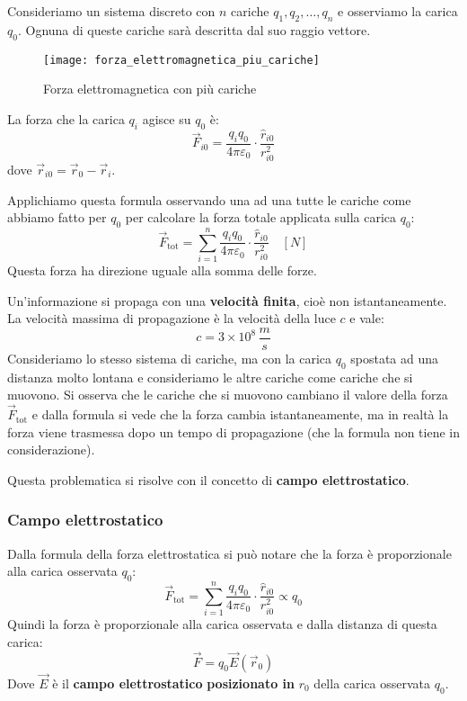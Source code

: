 \documentclass[a4paper]{article}
\begin{document}
Consideriamo un sistema discreto con \( n \) cariche \( q_1, q_2, \ldots, q_n \) e osserviamo
la carica \( q_0 \). Ognuna di queste cariche sarà descritta dal suo raggio vettore.
\begin{figure}[H]
  \centering
  \texttt{[image: forza\_elettromagnetica\_piu\_cariche]}
  \caption{Forza elettromagnetica con più cariche}
\end{figure}
\noindent
La forza che la carica \( q_i \) agisce su \( q_0 \) è:
\[
  \vec{F}_{i0} = \frac{q_i q_0}{4 \pi \varepsilon_0} \cdot \frac{\hat{r}_{i0}}{r_{i0}^2}
\] 
dove \( \vec{r}_{i0} = \vec{r}_0 - \vec{r}_i \).

Applichiamo questa formula osservando una ad una tutte le cariche come abbiamo fatto per
\( q_0 \) per calcolare la forza totale applicata sulla carica \( q_0 \):
\[
  \vec{F}_{\text{tot}} = \sum_{i=1}^{n} \frac{q_i q_0}{4 \pi \varepsilon_0} \cdot 
  \frac{\hat{r}_{i0}}{r_{i0}^2} \quad \left[ N \right]
\] 
Questa forza ha direzione uguale alla somma delle forze.

\vspace{1em}
\noindent
Un'informazione si propaga con una \textbf{velocità finita}, cioè non istantaneamente. La
velocità massima di propagazione è la velocità della luce \( c \) e vale:
\[
  c = 3 \times 10^8 \, \frac{m}{s}
\]
Consideriamo lo stesso sistema di cariche, ma con la carica \( q_0 \) spostata ad una
distanza molto lontana e consideriamo le altre cariche come cariche che si muovono.
Si osserva che le cariche che si muovono cambiano il valore della forza 
\( \vec{F}_{\text{tot}} \) e dalla formula si vede che la forza cambia istantaneamente, 
ma in realtà la forza viene trasmessa dopo un tempo di propagazione (che la formula non 
tiene in considerazione).

Questa problematica si risolve con il concetto di \textbf{campo elettrostatico}.

\subsubsection{Campo elettrostatico}
Dalla formula della forza elettrostatica si può notare che la forza è proporzionale
alla carica osservata \( q_0 \):
\[
  \vec{F}_{\text{tot}} = \sum_{i=1}^{n} \frac{q_i q_0}{4 \pi \varepsilon_0} \cdot
  \frac{\hat{r}_{i0}}{r_{i0}^2} \propto q_0
\] 
Quindi la forza è proporzionale alla carica osservata e dalla distanza di questa carica:
\[
  \vec{F} = q_0 \vec{E} \left( \vec{r}_0 \right) 
\] 
Dove \( \vec{E} \) è il \textbf{campo elettrostatico} \textbf{posizionato in } \( r_0 \)
della carica osservata \( q_0 \).
\end{document}
